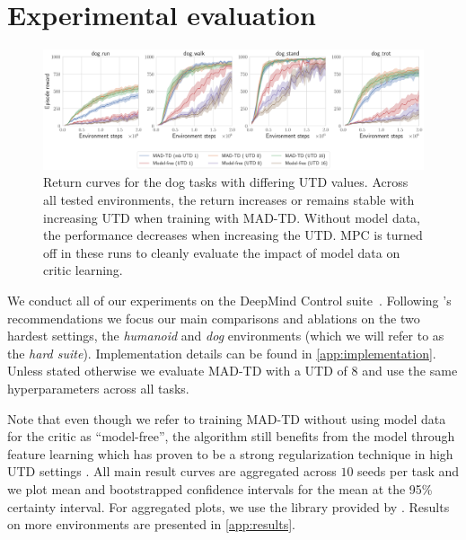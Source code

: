 
\section{Experimental evaluation}

\begin{figure}[t]
    \centering
    \includegraphics[width=1.0\linewidth]{figures/mad-td/dog_utd_comp.pdf}
    \caption{Return curves for the dog tasks with differing UTD values. Across all tested environments, the return increases or remains stable with increasing UTD when training with MAD-TD. Without model data, the performance decreases when increasing the UTD. MPC is turned off in these runs to cleanly evaluate the impact of model data on critic learning.}
    \label{fig:mad:main_dog}
\end{figure}


We conduct all of our experiments on the DeepMind Control suite~\parencite{tunyasuvunakool2020dmcontrol}. Following \textcite{nauman2024bigger}'s recommendations we focus our main comparisons and ablations on the two hardest settings, the \emph{humanoid} and \emph{dog} environments (which we will refer to as the \emph{hard suite}).
Implementation details can be found in \autoref{app:implementation}.
Unless stated otherwise we evaluate MAD-TD with a UTD of 8 and use the same hyperparameters across all tasks.

Note that even though we refer to training MAD-TD without using model data for the critic as ``model-free'', the algorithm still benefits from the model through feature learning which has proven to be a strong regularization technique in high UTD settings \parencite{schwarzer2023bigger}.
All main result curves are aggregated across $10$ seeds per task and we plot mean and bootstrapped confidence intervals for the mean at the 95\% certainty interval.
For aggregated plots, we use the library provided by \textcite{agarwal2021deep}.
Results on more environments are presented in \autoref{app:results}.

